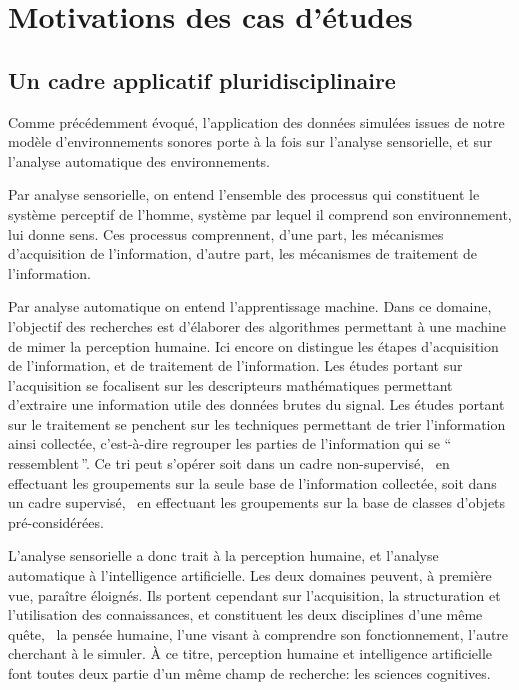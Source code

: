
\section{Motivations des cas d'études}

\subsection{Un cadre applicatif pluridisciplinaire}

Comme précédemment évoqué, l'application des données simulées issues de notre modèle d’environnements sonores porte à la fois sur l'analyse sensorielle, et sur l'analyse automatique des environnements.

Par analyse sensorielle, on entend l'ensemble des processus qui constituent le système perceptif de l'homme, système par lequel il comprend son environnement, lui donne sens. Ces processus comprennent, d'une part, les mécanismes d'acquisition de l'information, d'autre part, les mécanismes de traitement de l'information.

Par analyse automatique on entend l'apprentissage machine. Dans ce domaine, l'objectif des recherches est d'élaborer des algorithmes permettant à une machine de mimer la perception humaine. Ici encore on distingue les étapes d'acquisition de l'information, et de traitement de l'information. Les études portant sur l'acquisition se focalisent sur les descripteurs mathématiques permettant d'extraire une information utile des données brutes du signal. Les études portant sur le traitement se penchent sur les techniques permettant de trier l'information ainsi collectée, c’est-à-dire regrouper les parties de l'information qui se ``\,ressemblent\,''. Ce tri peut s'opérer soit dans un cadre non-supervisé, \ie~en effectuant les groupements sur la seule base de l'information collectée, soit dans un cadre supervisé, \ie~en effectuant les groupements sur la base de classes d'objets pré-considérées.

L'analyse sensorielle a donc trait à la perception humaine, et l'analyse automatique à l'intelligence artificielle. Les deux domaines peuvent, à première vue, paraître éloignés. Ils portent cependant sur l'acquisition, la structuration et l'utilisation des connaissances, et constituent les deux disciplines d'une même quête, \ie~la pensée humaine, l'une visant à comprendre son fonctionnement, l'autre cherchant à le simuler. À ce titre, perception humaine et intelligence artificielle font toutes deux partie d'un même champ de recherche: les sciences cognitives.


